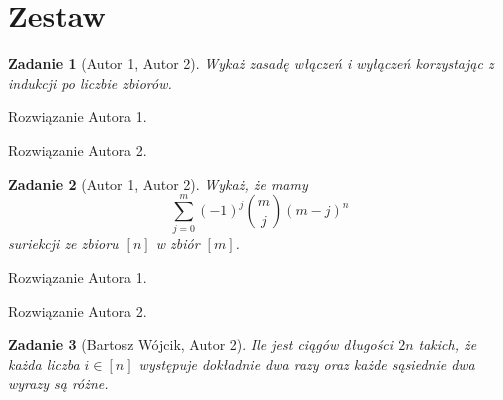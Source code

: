 \documentclass{mwart}
\newtheorem{zad}{Zadanie}[section]
\begin{document}
\newpage
\section{Zestaw}          %

\begin{zad}[Autor 1, Autor 2]
    Wykaż zasadę włączeń i wyłączeń korzystając z indukcji po liczbie zbiorów.
\end{zad}
\begin{mdframed}
    Rozwiązanie Autora 1.
\end{mdframed}
\begin{mdframed}
    Rozwiązanie Autora 2.
\end{mdframed}




\begin{zad}[Autor 1, Autor 2]
    Wykaż, że mamy
    \[
        \sum_{j=0}^{m}(-1)^j \binom{m}{j}(m-j)^n
    \]
    suriekcji ze zbioru $[n]$ w zbiór $[m]$.
\end{zad}
\begin{mdframed}
    Rozwiązanie Autora 1.
\end{mdframed}
\begin{mdframed}
    Rozwiązanie Autora 2.
\end{mdframed}



\begin{zad}[Bartosz Wójcik, Autor 2]
    Ile jest ciągów długości $2n$ takich, że każda liczba $i \in [n]$
    występuje dokładnie dwa razy oraz każde sąsiednie dwa wyrazy są różne.
\end{zad}
\end{document}
